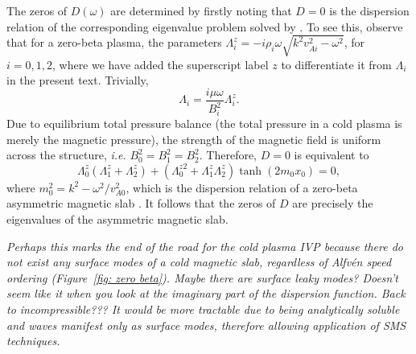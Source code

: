 \documentclass{aastex61}
\begin{document}
The zeros of $D(\omega)$ are determined by firstly noting that $D=0$ is the dispersion relation of the corresponding eigenvalue problem solved by \cite{zsa_etal18}. To see this, observe that for a zero-beta plasma, the parameters $\Lambda_i^z = -i\rho_i\omega\sqrt{k^2v_{Ai}^2 - \omega^2}$, for $i = 0,1,2$, where we have added the superscript label $z$ to differentiate it from $\Lambda_i$ in the present text. Trivially,
\begin{equation}
\Lambda_i = \frac{i\mu\omega}{B_i^2} \Lambda_i^z.
\end{equation}
Due to equilibrium total pressure balance (the total pressure in a cold plasma is merely the magnetic pressure), the strength of the magnetic field is uniform across the structure, \textit{i.e.} $B_0^2 = B_1^2 = B_2^2$. Therefore, $D=0$ is equivalent to
\begin{equation}
\Lambda_0^z(\Lambda_1^z + \Lambda_2^z) + (\Lambda_0^{z2} + \Lambda_1^z \Lambda_2^z)\tanh(2m_0x_0) = 0,
\end{equation}
where $m_0^2 = k^2 - \omega^2 / v_{A0}^2$, which is the dispersion relation of a zero-beta asymmetric magnetic slab \citep{zsa_etal18}. It follows that the zeros of $D$ are precisely the eigenvalues of the asymmetric magnetic slab.

\textit{Perhaps this marks the end of the road for the cold plasma IVP because there do not exist any surface modes of a cold magnetic slab, regardless of Alfv\'{e}n speed ordering (Figure~\ref{fig: zero beta}). Maybe there are surface leaky modes? Doesn't seem like it when you look at the imaginary part of the dispersion function. Back to incompressible??? It would be more tractable due to being analytically soluble and waves manifest only as surface modes, therefore allowing application of SMS techniques.}
\end{document}

